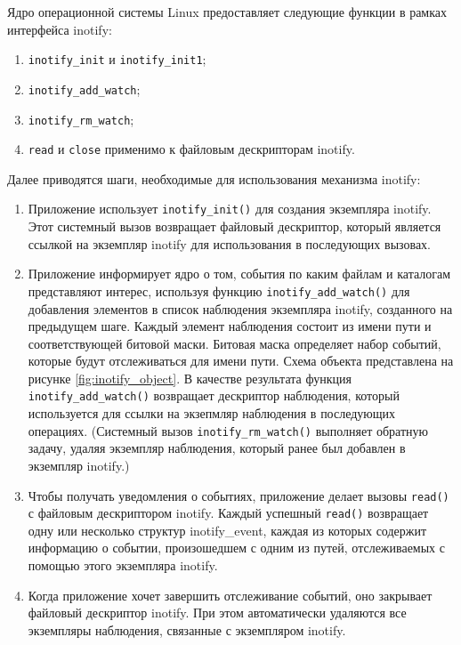 \documentclass[14pt, russian]{scrartcl}
\newcommand{\code}[1]{\texttt{#1}}
\begin{document}
Ядро операционной системы Linux предоставляет следующие функции в рамках
интерфейса inotify:

\begin{enumerate}
  \item \code{inotify\_init} и \code{inotify\_init1};
  \item \code{inotify\_add\_watch};
  \item \code{inotify\_rm\_watch};
  \item \code{read} и \code{close} применимо к файловым дескрипторам inotify.
\end{enumerate}

Далее приводятся шаги, необходимые для использования механизма inotify:

\begin{enumerate}
  \item Приложение использует \code{inotify\_init()} для создания экземпляра
        inotify. Этот системный вызов возвращает файловый дескриптор, который
        является ссылкой на экземпляр inotify для использования в последующих
        вызовах.
  \item Приложение информирует ядро о том, события по каким файлам и каталогам
        представляют интерес, используя функцию \code{inotify\_add\_watch()} для
        добавления элементов в список наблюдения экземпляра inotify, созданного
        на предыдущем шаге. Каждый элемент наблюдения состоит из имени пути и
        соответствующей битовой маски. Битовая маска определяет набор событий,
        которые будут отслеживаться для имени пути. Схема объекта представлена
        на рисунке \ref{fig:inotify_object}. В качестве результата функция
        \code{inotify\_add\_watch()} возвращает дескриптор наблюдения, который
        используется для ссылки на экзепмляр наблюдения в последующих операциях.
        (Системный вызов \code{inotify\_rm\_watch()} выполняет обратную задачу,
        удаляя экземпляр наблюдения, который ранее был добавлен в экземпляр
        inotify.)
  \item Чтобы получать уведомления о событиях, приложение делает вызовы
        \code{read()} с файловым дескриптором inotify. Каждый успешный
        \code{read()} возвращает одну или несколько структур inotify\_event,
        каждая из которых содержит информацию о событии, произошедшем с одним из
        путей, отслеживаемых с помощью этого экземпляра inotify.
  \item Когда приложение хочет завершить отслеживание событий, оно закрывает
        файловый дескриптор inotify. При этом автоматически удаляются все
        экземпляры наблюдения, связанные с экземпляром inotify.
\end{enumerate}
\end{document}
